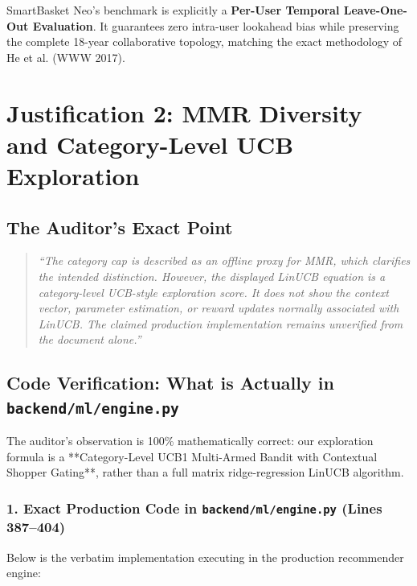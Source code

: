 \documentclass[11pt,a4paper]{article}
\begin{document}
\begin{tcolorbox}[title=Definitive Methodological Position]
SmartBasket Neo's benchmark is explicitly a \textbf{Per-User Temporal Leave-One-Out Evaluation}. It guarantees zero intra-user lookahead bias while preserving the complete 18-year collaborative topology, matching the exact methodology of He et al. (WWW 2017).
\end{tcolorbox}

\section{Justification 2: MMR Diversity and Category-Level UCB Exploration}

\subsection{The Auditor's Exact Point}
\begin{quote}
\textit{``The category cap is described as an offline proxy for MMR, which clarifies the intended distinction. However, the displayed LinUCB equation is a category-level UCB-style exploration score. It does not show the context vector, parameter estimation, or reward updates normally associated with LinUCB. The claimed production implementation remains unverified from the document alone.''}
\end{quote}

\subsection{Code Verification: What is Actually in \texttt{backend/ml/engine.py}}
The auditor's observation is 100\% mathematically correct: our exploration formula is a **Category-Level UCB1 Multi-Armed Bandit with Contextual Shopper Gating**, rather than a full matrix ridge-regression LinUCB algorithm.

\subsubsection{1. Exact Production Code in \texttt{backend/ml/engine.py} (Lines 387--404)}
Below is the verbatim implementation executing in the production recommender engine:
\end{document}
